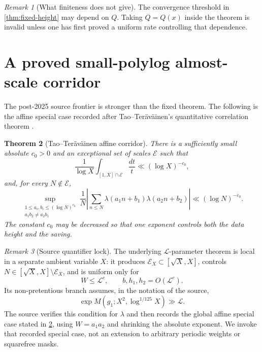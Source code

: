 \documentclass[11pt]{article}
\newtheorem{theorem}{Theorem}[section]
\theoremstyle{definition}
\theoremstyle{remark}
\newtheorem{remark}[theorem]{Remark}
\begin{document}
\begin{remark}[What finiteness does not give]
The convergence threshold in \cref{thm:fixed-height} may depend on
\(Q\).  Taking \(Q=Q(x)\) inside the theorem is invalid unless one
has first proved a uniform rate controlling that dependence.
\end{remark}

\section{A proved small-polylog almost-scale corridor}

The post-2025 source frontier is stronger than the fixed theorem.
The following is the affine special case recorded after
Tao--Ter\"av\"ainen's quantitative correlation theorem
\citep[Theorem~3.1 and Remarks~3.2]{TaoTeravainen2026}.

\begin{theorem}[Tao--Ter\"av\"ainen affine corridor]
\label{thm:tt-corridor}
There is a sufficiently small absolute \(c_0>0\) and an exceptional
set of scales \(\mathcal E\) such that
\begin{equation}
 \frac1{\log X}\int_{[1,X]\cap\mathcal E}\frac{dt}{t}
 \ll(\log X)^{-c_0},
\label{eq:tt-exceptional}
\end{equation}
and, for every \(N\notin\mathcal E\),
\begin{equation}
 \sup_{\substack{
 1\le a_i,b_i\le(\log N)^{c_0}\\
 a_1b_2\ne a_2b_1}}
 \frac1N\left|
 \sum_{n\le N}
 \lambda(a_1n+b_1)\lambda(a_2n+b_2)
 \right|
 \ll(\log N)^{-c_0}.
\label{eq:tt-affine}
\end{equation}
The constant \(c_0\) may be decreased so that one exponent controls
both the data height and the saving.
\end{theorem}

\begin{remark}[Source quantifier lock]
\label{rem:tt-source-lock}
The underlying \(\mathcal L\)-parameter theorem is local in a
separate ambient variable \(X\): it produces
\(\mathcal E_X\subset[\sqrt X,X]\), controls
\(N\in[\sqrt X,X]\setminus\mathcal E_X\), and is uniform only for
\[
 W\le\mathcal L^c,\qquad
 b,h_1,h_2=O(\mathcal L^c).
\]
Its non-pretentious branch assumes, in the notation of the source,
\[
 \exp M(g_1;X^2,\log^{1/125}X)\gg\mathcal L.
\]
The source verifies this condition for \(\lambda\) and then records
the global affine special case stated in
\cref{thm:tt-corridor}, using \(W=a_1a_2\) and shrinking the
absolute exponent.  We invoke that recorded special case, not an
extension to arbitrary periodic weights or squarefree masks.
\end{remark}
\end{document}
